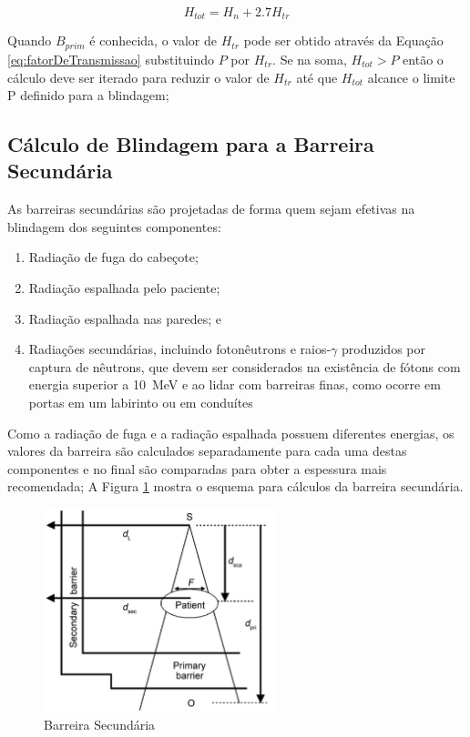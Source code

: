 \documentclass[11pt,a4paper]{article}
\begin{document}
            \begin{equation}
                H_{tot} = H_n + 2.7 H_{tr}
            \end{equation}

            Quando $B_{prim}$ é conhecida, o valor de $H_{tr}$ pode ser obtido através da Equação \ref{eq:fatorDeTransmissao} substituindo $P$ por $H_{tr}$. Se na soma,  $H_{tot} > P$ então o cálculo deve ser iterado para reduzir o valor de $H_{tr}$ até que $H_{tot}$ alcance o limite P definido para a blindagem;

        \subsection{Cálculo de Blindagem para a Barreira Secundária}

            As barreiras secundárias são projetadas de forma quem sejam efetivas na blindagem dos seguintes componentes:

                \begin{enumerate}
                    \item Radiação de fuga do cabeçote;
                    \item Radiação espalhada pelo paciente;
                    \item Radiação espalhada nas paredes; e 
                    \item Radiações secundárias, incluindo fotonêutrons e raios-$\gamma$ produzidos por captura de nêutrons, que devem ser considerados na existência de fótons com energia superior a \qty{10}{MeV} e ao lidar com barreiras finas, como ocorre em portas em um labirinto ou em conduítes 
                \end{enumerate}

            Como a radiação de fuga e a radiação espalhada possuem diferentes energias, os valores da barreira são calculados separadamente para cada uma destas componentes e no final são comparadas para obter a espessura mais recomendada; A Figura \ref{fig:esquemaTransmissaoRadiacaoEspalhadaPaciente} mostra o esquema para cálculos da barreira secundária. 

            \begin{figure}[h]
                \centering
                \includegraphics[width=0.6\textwidth]{Imagens/esquemaTransmissaoRadiacaoEspalhadaPaciente.JPG}
                \caption{Barreira Secundária}
                \label{fig:esquemaTransmissaoRadiacaoEspalhadaPaciente}
            \end{figure}
\end{document}
